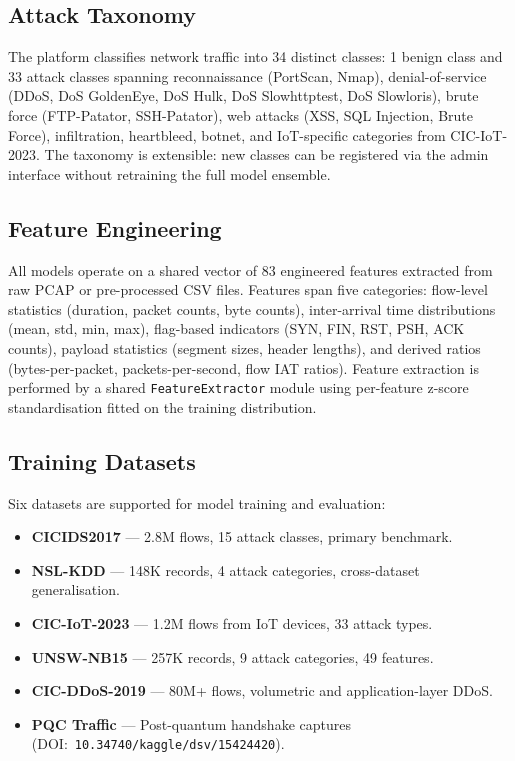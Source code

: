 \documentclass[11pt,a4paper]{article}
\begin{document}
\subsection{Attack Taxonomy}
The platform classifies network traffic into 34 distinct classes: 1 benign class and 33 attack classes spanning reconnaissance (PortScan, Nmap), denial-of-service (DDoS, DoS GoldenEye, DoS Hulk, DoS Slowhttptest, DoS Slowloris), brute force (FTP-Patator, SSH-Patator), web attacks (XSS, SQL Injection, Brute Force), infiltration, heartbleed, botnet, and IoT-specific categories from CIC-IoT-2023.  The taxonomy is extensible: new classes can be registered via the admin interface without retraining the full model ensemble.

\subsection{Feature Engineering}
All models operate on a shared vector of 83 engineered features extracted from raw PCAP or pre-processed CSV files.  Features span five categories: flow-level statistics (duration, packet counts, byte counts), inter-arrival time distributions (mean, std, min, max), flag-based indicators (SYN, FIN, RST, PSH, ACK counts), payload statistics (segment sizes, header lengths), and derived ratios (bytes-per-packet, packets-per-second, flow IAT ratios).  Feature extraction is performed by a shared \texttt{FeatureExtractor} module using per-feature z-score standardisation fitted on the training distribution.

\subsection{Training Datasets}
Six datasets are supported for model training and evaluation:
\begin{itemize}[leftmargin=*,nosep]
  \item \textbf{CICIDS2017} --- 2.8M flows, 15 attack classes, primary benchmark.
  \item \textbf{NSL-KDD} --- 148K records, 4 attack categories, cross-dataset generalisation.
  \item \textbf{CIC-IoT-2023} --- 1.2M flows from IoT devices, 33 attack types.
  \item \textbf{UNSW-NB15} --- 257K records, 9 attack categories, 49 features.
  \item \textbf{CIC-DDoS-2019} --- 80M+ flows, volumetric and application-layer DDoS.
  \item \textbf{PQC Traffic} --- Post-quantum handshake captures (DOI:~\texttt{10.34740/kaggle/dsv/15424420}).
\end{itemize}
\end{document}
